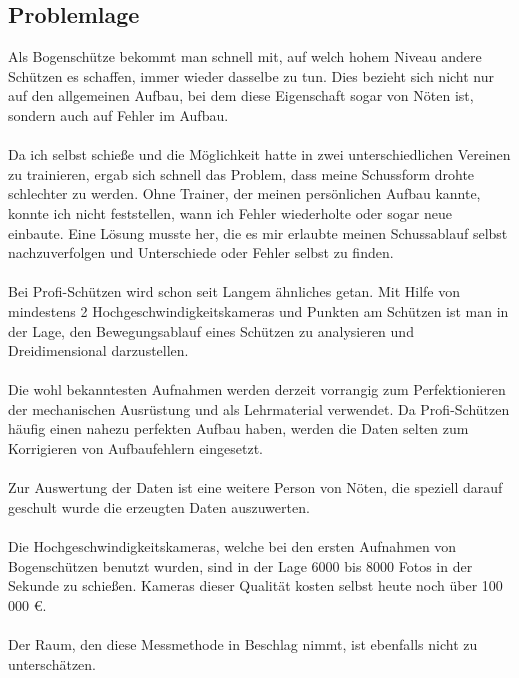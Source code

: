 \subsection{Problemlage}
Als Bogenschütze bekommt man schnell mit, auf welch hohem Niveau andere Schützen es 
schaffen, immer wieder dasselbe zu tun. Dies bezieht sich nicht nur auf den allgemeinen 
Aufbau, bei dem diese Eigenschaft sogar von Nöten ist, sondern auch auf Fehler im Aufbau.\\
\\
Da ich selbst schieße und die Möglichkeit hatte in zwei unterschiedlichen Vereinen zu 
trainieren, ergab sich schnell das Problem, dass meine Schussform drohte schlechter zu 
werden. Ohne Trainer, der meinen persönlichen Aufbau kannte, konnte ich nicht feststellen, 
wann ich Fehler wiederholte oder sogar neue einbaute. Eine Lösung musste her, die es mir 
erlaubte meinen Schussablauf selbst nachzuverfolgen und Unterschiede oder Fehler selbst zu 
finden.\\
\\
Bei Profi-Schützen wird schon seit Langem ähnliches getan. Mit Hilfe von mindestens 2 
Hochgeschwindigkeitskameras und Punkten am Schützen ist man in der Lage, den 
Bewegungsablauf eines Schützen zu analysieren und Dreidimensional darzustellen.\\
\\
Die wohl bekanntesten Aufnahmen werden derzeit vorrangig zum Perfektionieren der 
mechanischen Ausrüstung und als Lehrmaterial verwendet. Da Profi-Schützen häufig einen 
nahezu perfekten Aufbau haben, werden die Daten selten zum Korrigieren von Aufbaufehlern 
eingesetzt.\\
\\
Zur Auswertung der Daten ist eine weitere Person von Nöten, die speziell darauf geschult 
wurde die erzeugten Daten auszuwerten.\\
\\
Die Hochgeschwindigkeitskameras, welche bei den ersten Aufnahmen von Bogenschützen 
benutzt wurden, sind in der Lage 6000 bis 8000 Fotos in der Sekunde zu schießen. Kameras 
dieser Qualität kosten selbst heute noch über 100 000 \euro{}.\\
\\
Der Raum, den diese Messmethode in Beschlag nimmt, ist ebenfalls nicht zu unterschätzen.

